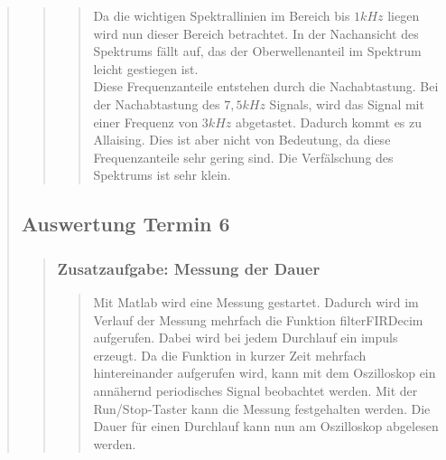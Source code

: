 \begin{quote}
\begin{quote}
\begin{quote}
            Da die wichtigen Spektrallinien im Bereich bis $1kHz$ liegen wird nun dieser Bereich betrachtet. In der
            Nachansicht des Spektrums fällt auf, das der Oberwellenanteil im Spektrum leicht gestiegen ist.\\
            Diese Frequenzanteile entstehen durch die Nachabtastung. Bei der Nachabtastung des $7,5kHz$ Signals, wird
            das Signal mit einer Frequenz von $3kHz$ abgetastet. Dadurch kommt es zu Allaising. Dies ist aber nicht von
            Bedeutung, da diese Frequenzanteile sehr gering sind. Die Verfälschung des Spektrums ist sehr klein.
			
		\end{quote} %
    \end{quote}  %
    
    \subsection{Auswertung Termin 6}
    \begin{quote}
        
        \subsubsection{Zusatzaufgabe: Messung der Dauer}
		\begin{quote}
			Mit Matlab wird eine Messung gestartet. Dadurch wird im Verlauf der Messung mehrfach die 
            Funktion filterFIRDecim aufgerufen. Dabei wird bei jedem Durchlauf ein impuls erzeugt. Da die
            Funktion in kurzer Zeit mehrfach hintereinander aufgerufen wird, kann mit dem Oszilloskop ein
            annähernd periodisches Signal beobachtet werden. Mit der Run/Stop-Taster kann die Messung
            festgehalten werden. Die Dauer für einen Durchlauf kann nun am Oszilloskop abgelesen
            werden.\\
        

\end{quote}
\end{quote}
\end{quote}
